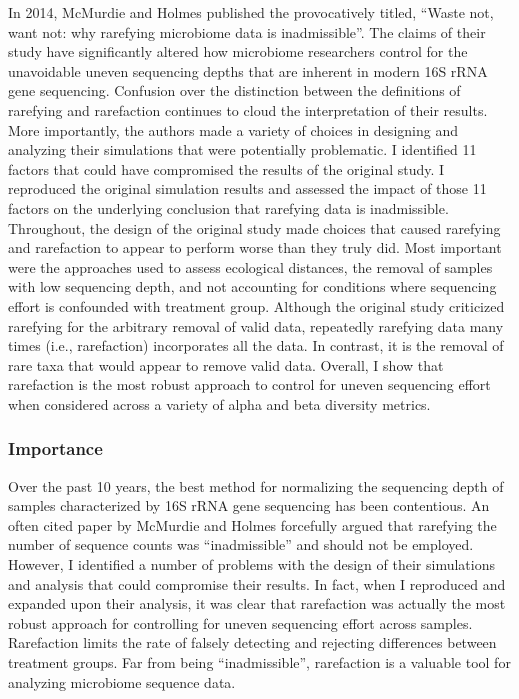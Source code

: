 \documentclass[
]{article}
\begin{document}
In 2014, McMurdie and Holmes published the provocatively titled, ``Waste
not, want not: why rarefying microbiome data is inadmissible''. The
claims of their study have significantly altered how microbiome
researchers control for the unavoidable uneven sequencing depths that
are inherent in modern 16S rRNA gene sequencing. Confusion over the
distinction between the definitions of rarefying and rarefaction
continues to cloud the interpretation of their results. More
importantly, the authors made a variety of choices in designing and
analyzing their simulations that were potentially problematic. I
identified 11 factors that could have compromised the results of the
original study. I reproduced the original simulation results and
assessed the impact of those 11 factors on the underlying conclusion
that rarefying data is inadmissible. Throughout, the design of the
original study made choices that caused rarefying and rarefaction to
appear to perform worse than they truly did. Most important were the
approaches used to assess ecological distances, the removal of samples
with low sequencing depth, and not accounting for conditions where
sequencing effort is confounded with treatment group. Although the
original study criticized rarefying for the arbitrary removal of valid
data, repeatedly rarefying data many times (i.e., rarefaction)
incorporates all the data. In contrast, it is the removal of rare taxa
that would appear to remove valid data. Overall, I show that rarefaction
is the most robust approach to control for uneven sequencing effort when
considered across a variety of alpha and beta diversity metrics.

\hypertarget{importance}{%
\subsubsection{Importance}\label{importance}}

Over the past 10 years, the best method for normalizing the sequencing
depth of samples characterized by 16S rRNA gene sequencing has been
contentious. An often cited paper by McMurdie and Holmes forcefully
argued that rarefying the number of sequence counts was ``inadmissible''
and should not be employed. However, I identified a number of problems
with the design of their simulations and analysis that could compromise
their results. In fact, when I reproduced and expanded upon their
analysis, it was clear that rarefaction was actually the most robust
approach for controlling for uneven sequencing effort across samples.
Rarefaction limits the rate of falsely detecting and rejecting
differences between treatment groups. Far from being ``inadmissible'',
rarefaction is a valuable tool for analyzing microbiome sequence data.
\end{document}
